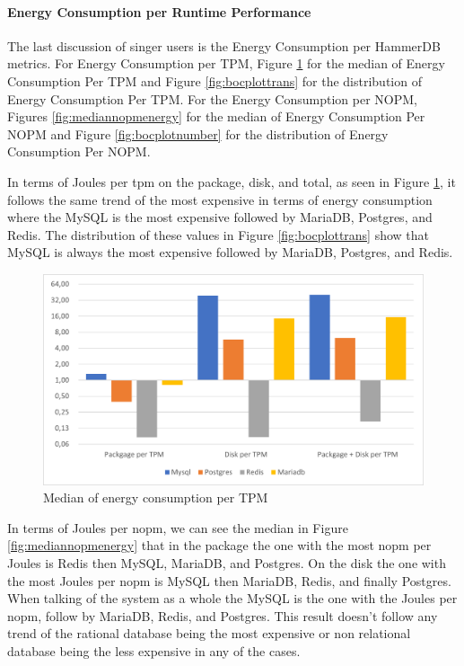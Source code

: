 



\paragraph{Energy Consumption per Runtime Performance} 

The last discussion of singer users is the Energy Consumption per HammerDB metrics. For Energy Consumption per TPM, Figure \ref{fig:mediantpmenergy} for the median of Energy Consumption Per TPM and Figure \ref{fig:bocplottrans} for the distribution of Energy Consumption Per TPM. For the Energy Consumption per NOPM, Figures \ref{fig:mediannopmenergy} for the median of Energy Consumption Per NOPM and Figure \ref{fig:bocplotnumber} for the distribution of Energy Consumption Per NOPM.




In terms of Joules per \gls{tpm} on the package, disk, and total, as seen in Figure \ref{fig:mediantpmenergy}, it follows the same trend of the most expensive in terms of energy consumption where the MySQL is the most expensive followed by MariaDB, Postgres, and Redis. The distribution of these values in Figure \ref{fig:bocplottrans} show that MySQL is always the most expensive followed by MariaDB, Postgres, and Redis.

\begin{figure}[H]
\centering
    \includegraphics[width=0.8\columnwidth]{results/median/energy-tpm.png}
\caption{Median of energy consumption per TPM}
\label{fig:mediantpmenergy}
\end{figure}







    In terms of Joules per \gls{nopm}, we can see the median in Figure \ref{fig:mediannopmenergy} that in the package the one with the most \gls{nopm} per Joules is Redis then MySQL, MariaDB, and Postgres. On the disk the one with the most Joules per \gls{nopm} is MySQL then MariaDB, Redis, and finally Postgres. When talking of the system as a whole the MySQL is the one with the Joules per \gls{nopm}, follow by MariaDB, Redis, and Postgres. This result doesn't follow any trend of the rational database being the most expensive or non relational database being the less expensive in any of the cases.

